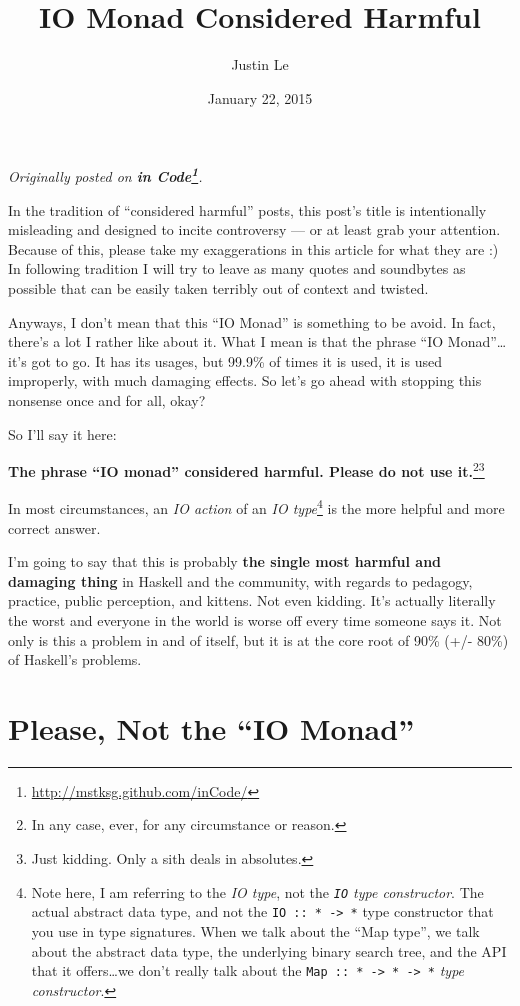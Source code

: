 \documentclass[]{article}
\title{IO Monad Considered Harmful}
\author{Justin Le}
\date{January 22, 2015}
\renewcommand{\href}[2]{#2\footnote{\url{#1}}}
\begin{document}
\maketitle

\emph{Originally posted on
\textbf{\href{http://mstksg.github.com/inCode/}{in Code}}.}

In the tradition of ``considered harmful'' posts, this post's title is
intentionally misleading and designed to incite controversy --- or at
least grab your attention. Because of this, please take my exaggerations
in this article for what they are :) In following tradition I will try
to leave as many quotes and soundbytes as possible that can be easily
taken terribly out of context and twisted.

Anyways, I don't mean that this ``IO Monad'' is something to be avoid.
In fact, there's a lot I rather like about it. What I mean is that the
phrase ``IO Monad''\ldots{}it's got to go. It has its usages, but 99.9\%
of times it is used, it is used improperly, with much damaging effects.
So let's go ahead with stopping this nonsense once and for all, okay?

So I'll say it here:

\textbf{The phrase ``IO monad'' considered harmful. Please do not use
it.}\footnote{In any case, ever, for any circumstance or reason.}\footnote{Just
  kidding. Only a sith deals in absolutes.}

In most circumstances, an \emph{IO action} of an \emph{IO
type}\footnote{Note here, I am referring to the \emph{IO type}, not the
  \emph{\texttt{IO} type constructor}. The actual abstract data type,
  and not the \texttt{IO\ ::\ *\ -\textgreater{}\ *} type constructor
  that you use in type signatures. When we talk about the ``Map type'',
  we talk about the abstract data type, the underlying binary search
  tree, and the API that it offers\ldots{}we don't really talk about the
  \texttt{Map\ ::\ *\ -\textgreater{}\ *\ -\textgreater{}\ *} \emph{type
  constructor}.} is the more helpful and more correct answer.

I'm going to say that this is probably \textbf{the single most harmful
and damaging thing} in Haskell and the community, with regards to
pedagogy, practice, public perception, and kittens. Not even kidding.
It's actually literally the worst and everyone in the world is worse off
every time someone says it. Not only is this a problem in and of itself,
but it is at the core root of 90\% (+/- 80\%) of Haskell's problems.

\section{\texorpdfstring{Please, Not the ``IO
Monad''}{Please, Not the IO Monad}}\label{please-not-the-io-monad}
\end{document}
